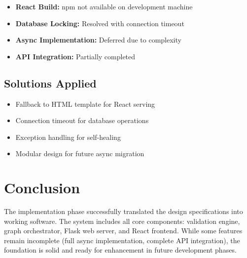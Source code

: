 \begin{itemize}
    \item \textbf{React Build:} npm not available on development machine
    \item \textbf{Database Locking:} Resolved with connection timeout
    \item \textbf{Async Implementation:} Deferred due to complexity
    \item \textbf{API Integration:} Partially completed
\end{itemize}

\subsection{Solutions Applied}

\begin{itemize}
    \item Fallback to HTML template for React serving
    \item Connection timeout for database operations
    \item Exception handling for self-healing
    \item Modular design for future async migration
\end{itemize}

\section{Conclusion}

The implementation phase successfully translated the design specifications into working software. The system includes all core components: validation engine, graph orchestrator, Flask web server, and React frontend. While some features remain incomplete (full async implementation, complete API integration), the foundation is solid and ready for enhancement in future development phases.
